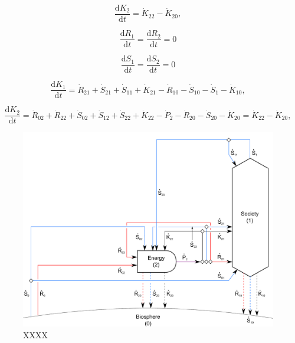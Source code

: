 \begin{equation} \label{eq:CV_K_dot_2}
	\frac{\mathrm{d}K_{2}}{\mathrm{d}t}
	=  \dot{K}_{22} - \dot{K}_{20},
\end{equation}

\begin{equation}\label{eq:dR_dt_zero}
	\frac{\mathrm{d}R_{1}}{\mathrm{d}t} = \frac{\mathrm{d}R_{2}}{\mathrm{d}t} = 0
\end{equation}

\begin{equation}\label{eq:dS_dt_zero}
	\frac{\mathrm{d}S_{1}}{\mathrm{d}t} = \frac{\mathrm{d}S_{2}}{\mathrm{d}t} = 0
\end{equation}

\begin{equation} \label{eq:CV_R_dot_1b}
	\frac{\mathrm{d}K_{1}}{\mathrm{d}t}
	=  \dot{R}_{21} 
	+ \dot{S}_{21} + \dot{S}_{11}
	+ \dot{K}_{21} 
	- \dot{R}_{10} 
	- \dot{S}_{10} - \dot{S}_{1}
	- \dot{K}_{10},
\end{equation}

\begin{equation} \label{eq:CV_R_dot_2b}
	\frac{\mathrm{d}K_{2}}{\mathrm{d}t}
	=  \dot{R}_{02} + \dot{R}_{22} 
	+ \dot{S}_{02} + \dot{S}_{12} + \dot{S}_{22} 
	+ \dot{K}_{22}
	- \dot{P}_{2}
	- \dot{R}_{20} 
	- \dot{S}_{20} 
	- \dot{K}_{20}
	= \dot{K}_{22} - \dot{K}_{20},
\end{equation}

\begin{figure}[h!]
\centering
\includegraphics[width=0.8\linewidth]{Part_1/Chapter_Materials/images/2_sector_materials.pdf}
\caption{XXXX}
\label{fig:B_materials}
\end{figure}

